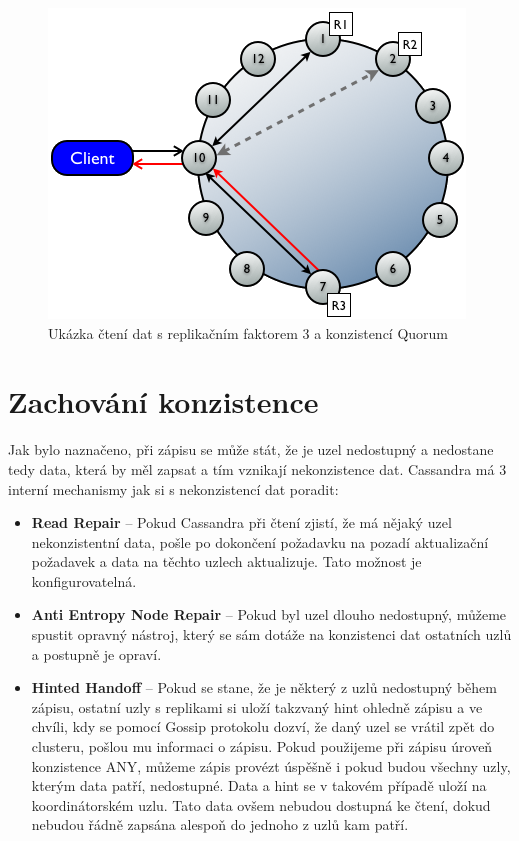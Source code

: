 \begin{figure}[h]
\centering
\includegraphics[scale=0.55]{images/read}
\caption{Ukázka čtení dat s replikačním faktorem 3 a konzistencí Quorum}
\label{fig:vnodes}
\end{figure}


\section{Zachování konzistence}%
Jak bylo naznačeno, při zápisu se může stát, že je uzel nedostupný a nedostane tedy data, která by měl zapsat a tím vznikají nekonzistence dat. Cassandra má 3 interní mechanismy jak si s nekonzistencí dat poradit: 

\begin{itemize}
\item \textbf{Read Repair} – Pokud Cassandra při čtení zjistí, že má nějaký uzel nekonzistentní data, pošle po dokončení požadavku na pozadí aktualizační požadavek a data na těchto uzlech aktualizuje. Tato možnost je konfigurovatelná.
\item \textbf{Anti Entropy Node Repair} – Pokud byl uzel dlouho nedostupný, můžeme spustit opravný nástroj, který se sám dotáže na konzistenci dat ostatních uzlů a postupně je opraví. 
\item \textbf{Hinted Handoff} – Pokud se stane, že je některý z uzlů nedostupný během zápisu, ostatní uzly s replikami si uloží takzvaný hint ohledně zápisu a ve chvíli, kdy se pomocí Gossip protokolu dozví, že daný uzel se vrátil zpět do clusteru, pošlou mu informaci o zápisu. Pokud použijeme při zápisu úroveň konzistence ANY, můžeme zápis provézt úspěšně i pokud budou všechny uzly, kterým data patří, nedostupné. Data a hint se v takovém případě uloží na koordinátorském uzlu. Tato data ovšem nebudou dostupná ke čtení, dokud nebudou řádně zapsána alespoň do jednoho z uzlů kam patří.
\end{itemize}

